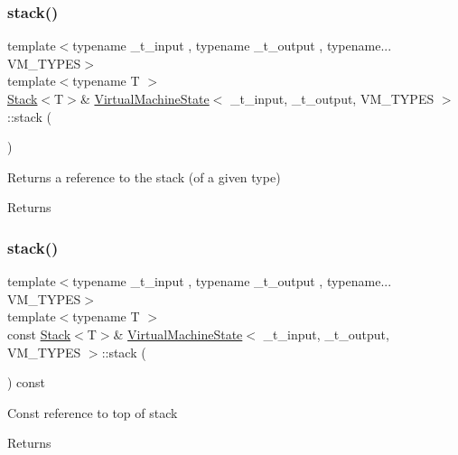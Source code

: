 \subsubsection{\texorpdfstring{stack()}{stack()}\hspace{0.1cm}{\footnotesize\ttfamily [1/2]}}
{\footnotesize\ttfamily template$<$typename \+\_\+t\+\_\+input , typename \+\_\+t\+\_\+output , typename... V\+M\+\_\+\+T\+Y\+P\+ES$>$ \\
template$<$typename T $>$ \\
\hyperlink{class_stack}{Stack}$<$T$>$\& \hyperlink{class_virtual_machine_state}{Virtual\+Machine\+State}$<$ \+\_\+t\+\_\+input, \+\_\+t\+\_\+output, V\+M\+\_\+\+T\+Y\+P\+ES $>$\+::stack (\begin{DoxyParamCaption}{ }\end{DoxyParamCaption})\hspace{0.3cm}{\ttfamily [inline]}}

Returns a reference to the stack (of a given type) \begin{DoxyReturn}{Returns}

\end{DoxyReturn}
\mbox{\label{class_virtual_machine_state_ad238f813b3be9009e6bf0c63cf45b221}} 
\subsubsection{\texorpdfstring{stack()}{stack()}\hspace{0.1cm}{\footnotesize\ttfamily [2/2]}}
{\footnotesize\ttfamily template$<$typename \+\_\+t\+\_\+input , typename \+\_\+t\+\_\+output , typename... V\+M\+\_\+\+T\+Y\+P\+ES$>$ \\
template$<$typename T $>$ \\
const \hyperlink{class_stack}{Stack}$<$T$>$\& \hyperlink{class_virtual_machine_state}{Virtual\+Machine\+State}$<$ \+\_\+t\+\_\+input, \+\_\+t\+\_\+output, V\+M\+\_\+\+T\+Y\+P\+ES $>$\+::stack (\begin{DoxyParamCaption}{ }\end{DoxyParamCaption}) const\hspace{0.3cm}{\ttfamily [inline]}}

Const reference to top of stack \begin{DoxyReturn}{Returns}

\end{DoxyReturn}
\mbox{\label{class_virtual_machine_state_a08cc1e3bf25e9bf58f798102e364856a}} 
